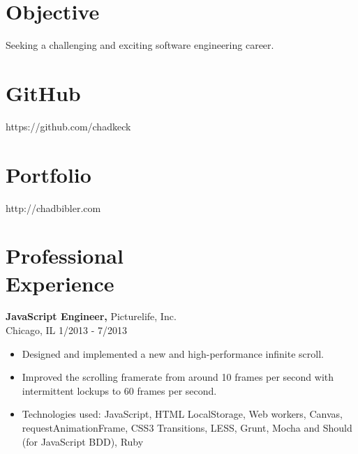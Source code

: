 \documentclass[margin]{res}
\begin{document}
 
 
 
\address{{\bf Address} \\ 531 Carlysle Dr. \#7 \\ Clarendon Hills, IL 60514  \\
        (630) 414-8700 }
\address{{\bf } }

\begin{resume} 
 
\section{Objective} 
Seeking a challenging and exciting software engineering career.

\section{GitHub}
https://github.com/chadkeck

\section{Portfolio}
http://chadbibler.com


\section{Professional \\ Experience}

{\bf JavaScript Engineer,} Picturelife, Inc.\\ Chicago, IL \hfill 1/2013 - 7/2013
\begin{itemize} \itemsep -2pt  %
\item Designed and implemented a new and high-performance infinite scroll.
\item Improved the scrolling framerate from around 10 frames per second with intermittent lockups to 60 frames per second.
\item Technologies used: JavaScript, HTML LocalStorage, Web workers, Canvas, requestAnimationFrame, CSS3 Transitions, LESS, Grunt, Mocha and Should (for JavaScript BDD), Ruby
\end{itemize}


\end{resume}
\end{document}
